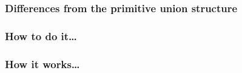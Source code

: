 

\subsubsection{Differences from the primitive union structure}

\subsubsection{How to do it…}


\subsubsection{How it works…}




